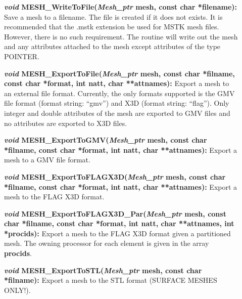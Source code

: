 \documentclass[12pt]{article}
\begin{document}
\begin{description}
  \item[]{\bf {\em void} MESH\_WriteToFile({\em Mesh\_ptr} mesh, const
      char *filename):} Save a mesh to a filename. The file is created
    if it does not exists. It is recommended that the .mstk extension
    be used for MSTK mesh files.  However, there is no such
    requirement. The routine will write out the mesh and any
    attributes attached to the mesh except attributes of the type
    POINTER.
  
  
\item[]{\bf {\em void} MESH\_ExportToFile({\em Mesh\_ptr} mesh, const
    char *filname, const char *format, int natt, char **attnames):}
  Export a mesh to an external file format. Currently, the only
  formats supported is the GMV file format (format string: ``gmv'')
  and X3D (format string: ``flag''). Only integer and double
  attributes of the mesh are exported to GMV files and no attributes
  are exported to X3D files.

\item[]{\bf {\em void} MESH\_ExportToGMV({\em Mesh\_ptr} mesh, const
    char *filname, const char *format, int natt, char **attnames):} Export a mesh to a GMV file format. 

\item[]{\bf {\em void} MESH\_ExportToFLAGX3D({\em Mesh\_ptr} mesh, const
    char *filname, const char *format, int natt, char **attnames):} Export a mesh to the FLAG X3D format.

\item[]{\bf {\em void} MESH\_ExportToFLAGX3D\_Par({\em Mesh\_ptr} mesh,
    const char *filname, const char *format, int natt, char
    **attnames, int *procids):} Export a mesh to the FLAG X3D format
  given a partitioned mesh. The owning processor for each element is
  given in the array {\bf procids}.

\item[]{\bf {\em void} MESH\_ExportToSTL({\em Mesh\_ptr} mesh, const
    char *filname):} Export a mesh to the STL format (SURFACE MESHES ONLY!).


\end{description}
\end{document}
